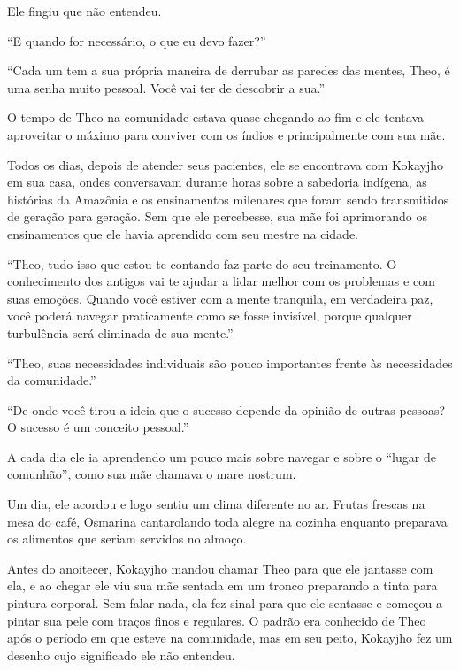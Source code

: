 Ele fingiu que não entendeu.

``E quando for necessário, o que eu devo fazer?''

``Cada um tem a sua própria maneira de derrubar as paredes das mentes,
Theo, é uma senha muito pessoal. Você vai ter de descobrir a sua.''

\asterisc


O tempo de Theo na comunidade estava quase chegando ao fim e ele tentava
aproveitar o máximo para conviver com os índios e principalmente com sua
mãe.

Todos os dias, depois de atender seus pacientes, ele se encontrava com
Kokayjho em sua casa, ondes conversavam durante horas sobre a sabedoria
indígena, as histórias da Amazônia e os ensinamentos milenares que foram
sendo transmitidos de geração para geração. Sem que ele percebesse, sua
mãe foi aprimorando os ensinamentos que ele havia aprendido com seu
mestre na cidade.

``Theo, tudo isso que estou te contando faz parte do seu treinamento. O
conhecimento dos antigos vai te ajudar a lidar melhor com os problemas e
com suas emoções. Quando você estiver com a mente tranquila, em
verdadeira paz, você poderá navegar praticamente como se fosse
invisível, porque qualquer turbulência será eliminada de sua mente.''

``Theo, suas necessidades individuais são pouco importantes frente às
necessidades da comunidade.''

``De onde você tirou a ideia que o sucesso depende da opinião de outras
pessoas? O sucesso é um conceito pessoal.''

A cada dia ele ia aprendendo um pouco mais sobre navegar e sobre o
``lugar de comunhão'', como sua mãe chamava o mare nostrum.

Um dia, ele acordou e logo sentiu um clima diferente no ar. Frutas
frescas na mesa do café, Osmarina cantarolando toda alegre na cozinha
enquanto preparava os alimentos que seriam servidos no almoço.

Antes do anoitecer, Kokayjho mandou chamar Theo para que ele jantasse
com ela, e ao chegar ele viu sua mãe sentada em um tronco preparando a
tinta para pintura corporal. Sem falar nada, ela fez sinal para que ele
sentasse e começou a pintar sua pele com traços finos e regulares. O
padrão era conhecido de Theo após o período em que esteve na comunidade,
mas em seu peito, Kokayjho fez um desenho cujo significado ele não entendeu.

